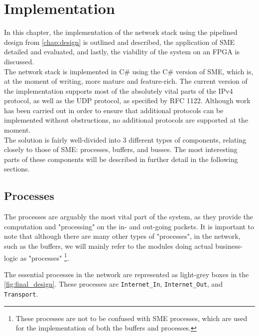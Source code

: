 \chapter{Implementation}
\label{chap:implementation}
In this chapter, the implementation of the network stack using the
pipelined design from \autoref{chap:design} is outlined and described,
the application of SME detailed and evaluated, and lastly, the viability
of the system on an FPGA is discussed.\\

The network stack is implemented in C\# using the C\# version of SME, which is,
at the moment of writing, more mature and feature-rich. The current version of
the implementation supports most of the absolutely vital parts of the IPv4
protocol, as well as the UDP protocol, as specified by RFC 1122\cite{RFC1122}.
Although work has been carried out in order to ensure that additional protocols
can be implemented without obstructions, no additional protocols are supported
at the moment.\\
The solution is fairly well-divided into 3 different types of components,
relating closely to those of SME: processes, buffers, and busses. The most
interesting parts of these components will be described in further detail in the
following sections.


\section{Processes}
The processes are arguably the most vital part of the system, as they provide
the computation and "processing" on the in- and out-going packets.
It is important to note that although there are many other types of "processes",
in the network, such as the buffers, we will mainly refer to the modules doing
actual business-logic as "processes"  \footnote{These processes are not to be
confused with SME processes, which are used for the implementation of both the
buffers and processes.}.

The essential processes in the network are represented as light-grey boxes in
the \autoref{fig:final_design}. These processes are \texttt{Internet\_In},
\texttt{Internet\_Out}, and \texttt{Transport}.


